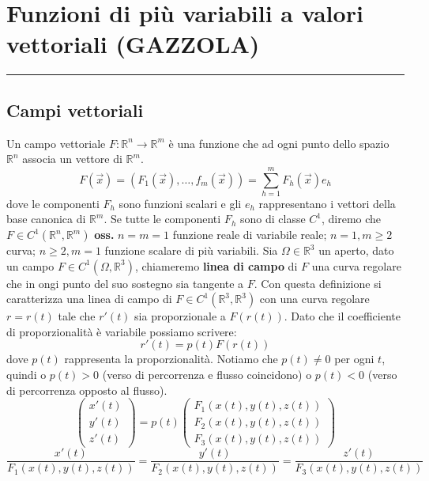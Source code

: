 \section{Funzioni di più variabili a valori vettoriali (GAZZOLA)}
\rule{\textwidth}{2pt}
\subsection{Campi vettoriali}
Un campo vettoriale $F: \mathbb{R}^n \rightarrow  \mathbb{R}^m$ è una funzione che ad ogni  punto dello spazio $\mathbb{R}^n$ associa un vettore di $\mathbb{R}^m$.
\[
    F(\vec{x}) = \left(F_1(\vec{x}), \dots, f_m(\vec{x})\right) = \sum_{h=1}^{m} F_h(\vec{x})e_h
\]
dove le componenti $F_h$ sono funzioni scalari e gli $e_h$ rappresentano i vettori della base canonica di $\mathbb{R}^m$. Se tutte le componenti $F_h$ sono di classe $C^1$, diremo che $F \in C^1(\mathbb{R}^n, \mathbb{R}^m)$\newline
\newline
\textbf{oss.} $n=m=1$ funzione reale di variabile reale; $n=1, m \geq 2$ curva; $n \geq 2, m = 1$ funzione scalare di più variabili.\newline
\newline
Sia $\Omega \in \mathbb{R}^3$ un aperto, dato un campo $F \in C^1(\Omega, \mathbb{R}^3)$, chiameremo \textbf{linea di campo} di $F$ una curva regolare che in ongi punto del suo sostegno sia tangente a $F$.\newline
Con questa definizione si caratterizza una linea di campo di $F \in C^1(\mathbb{R}^3, \mathbb{R}^3)$ con una curva regolare $r = r(t)$ tale che $r'(t)$ sia proporzionale a $F(r(t))$. Dato che il coefficiente di proporzionalità è variabile possiamo scrivere:
\[
    r'(t) = p(t) F(r(t))
\]
dove $p(t)$ rappresenta la proporzionalità. Notiamo che $p(t) \neq 0$ per ogni $t$, quindi o $p(t) > 0$ (verso di percorrenza e flusso coincidono) o $p(t) < 0$ (verso di percorrenza opposto al flusso).
\[
    \left(\begin{matrix}
        x'(t)\\
        y'(t)\\
        z'(t)
    \end{matrix}\right) = p(t) \left(\begin{matrix}
        F_1(x(t),y(t),z(t))\\
        F_2(x(t),y(t),z(t))\\
        F_3(x(t),y(t),z(t))
    \end{matrix}\right)
\]
\[
    \frac{x'(t)}{F_1(x(t),y(t),z(t))} = 
    \frac{y'(t)}{F_2(x(t),y(t),z(t))} = 
    \frac{z'(t)}{F_3(x(t),y(t),z(t))}
\]
